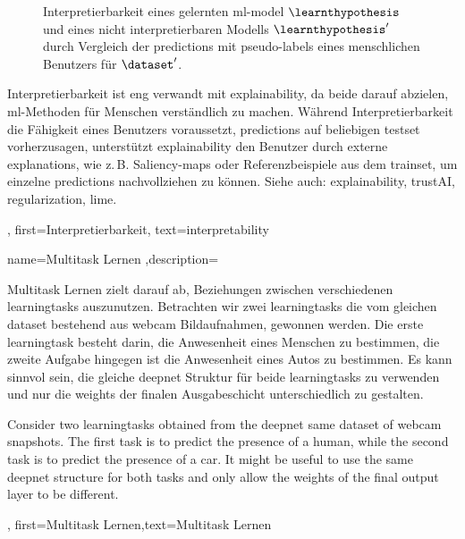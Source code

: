 {{{{{{\begin{figure}[H]
\begin{center}
\begin{tikzpicture}[x=1.5cm, y=1cm]
            \end{tikzpicture}
            \caption{Interpretierbarkeit eines gelernten \gls{ml}-\gls{model} $\learnthypothesis$ 
            und eines nicht interpretierbaren Modells $\learnthypothesis'$ durch Vergleich der \glspl{prediction} 
            mit pseudo-\glspl{label} eines menschlichen Benutzers für $\dataset'$. 
            \label{fig_aug_simulatability_dict}}
            \end{center}
        \end{figure}
        Interpretierbarkeit ist eng verwandt mit \gls{explainability}, da beide darauf abzielen, 
        \gls{ml}-Methoden für Menschen verständlich zu machen. Während Interpretierbarkeit die Fähigkeit 
        eines Benutzers voraussetzt, \glspl{prediction} auf beliebigen \gls{testset} vorherzusagen, 
        unterstützt \gls{explainability} den Benutzer durch externe \glspl{explanation}, 
        wie z.\,B. Saliency-\glspl{map} oder Referenzbeispiele aus dem \gls{trainset}, 
        um einzelne \glspl{prediction} nachvollziehen zu können.
        Siehe auch: \gls{explainability}, \gls{trustAI}, \gls{regularization}, \gls{lime}.},
    first={Interpretierbarkeit},
    text={interpretability}
}




{name={Multitask Lernen },description=
	{Multitask Lernen  zielt darauf ab, Beziehungen  zwischen verschiedenen  \glspl{learningtask} auszunutzen.
	Betrachten wir zwei  \glspl{learningtask} die vom gleichen  \gls{dataset} bestehend aus webcam Bildaufnahmen, gewonnen werden. 
	Die erste  \gls{learningtask} besteht darin, die Anwesenheit eines Menschen zu bestimmen, die zweite Aufgabe hingegen ist die Anwesenheit 
	eines Autos zu bestimmen. Es kann sinnvol sein, die gleiche  \gls{deepnet} Struktur für beide  \glspl{learningtask}  zu verwenden und nur die \gls{weights} 
	der finalen Ausgabeschicht unterschiedlich zu gestalten. 
	
		 Consider two \gls{learningtask}s obtained from the  \gls{deepnet} 
		same \gls{dataset} of webcam snapshots. The first task is to predict the presence 
		of a human, while the second task is to predict the presence of a car. It might be useful 
		to use the same \gls{deepnet} structure for both tasks and only allow the \gls{weights} of 
		the final output layer to be different.},
	first={Multitask Lernen},text={Multitask Lernen}
}

}}}}
